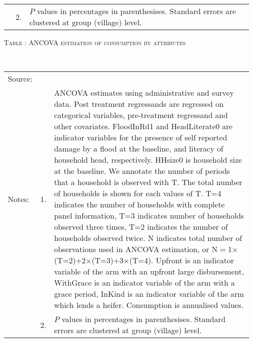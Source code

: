 \begin{minipage}[t]{14cm}
\begin{tabular}{>{\hfill\scriptsize}p{1cm}<{}>{\hfill\scriptsize}p{.25cm}<{}>{\scriptsize}p{12cm}<{\hfill}}
& 2. & $P$ values in percentages in parenthesises. Standard errors are clustered at group (village) level.
\end{tabular}
\end{minipage}

\hspace{-1cm}\begin{minipage}[t]{14cm}
\hfil\textsc{\normalsize Table \thetable: ANCOVA estimation of consumption by attributes \label{tab ANCOVA consumption attributes original HH}}\\
\setlength{\tabcolsep}{1pt}
\setlength{\baselineskip}{8pt}
\renewcommand{\arraystretch}{.55}
\hfil{}\\
\renewcommand{\arraystretch}{.8}
\setlength{\tabcolsep}{1pt}
\begin{tabular}{>{\hfill\scriptsize}p{1cm}<{}>{\hfill\scriptsize}p{.25cm}<{}>{\scriptsize}p{12cm}<{\hfill}}
Source:& \multicolumn{2}{l}{\scriptsize Estimated with GUK administrative and survey data.}\\
Notes: & 1. & ANCOVA estimates using administrative and survey data. Post treatment regressands are regressed on categorical variables, pre-treatment regressand and other covariates. \textsf{FloodInRd1} and \textsf{HeadLiterate0} are indicator variables for the presence of self reported damage by a flood at the baseline, and literacy of household head, respectively. \textsf{HHsize0} is household size at the baseline. We annotate the number of periods that a household is observed with \textsf{T}. The total number of households is shown for each values of \textsf{T}. \textsf{T=4} indicates the number of households with complete panel information, \textsf{T=3} indicates number of households observed three times, \textsf{T=2} indicates the number of households observed twice. \textsf{N} indicates total number of observations used in ANCOVA estimation, or \textsf{N$=$1$\times$(T=2)+2$\times$(T=3)+3$\times$(T=4)}.  \textsf{Upfront} is an indicator variable of the arm with an upfront large disbursement, \textsf{WithGrace} is an indicator variable of the arm with a grace period, \textsf{InKind} is an indicator variable of the arm which lends a heifer. Consumption is annualised values. \\
& 2. & $P$ values in percentages in parenthesises. Standard errors are clustered at group (village) level.
\end{tabular}
\end{minipage}



